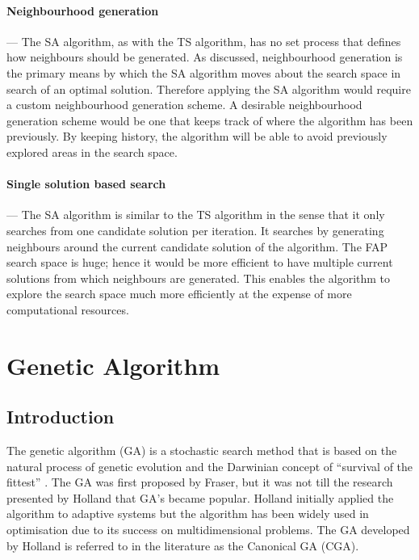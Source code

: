 \paragraph{Neighbourhood generation}
--- The \gls{SA} algorithm, as with the \gls{TS} algorithm, has no set process that defines how neighbours should be generated. As discussed, neighbourhood generation is the primary means by which the \gls{SA} algorithm moves about the search space in search of an optimal solution. Therefore applying the \gls{SA} algorithm would require a custom neighbourhood generation scheme. A desirable neighbourhood generation scheme would be one that keeps track of where the algorithm has been previously. By keeping history, the algorithm will be able to avoid previously explored areas in the search space.
\paragraph{Single solution based search}
--- The \gls{SA} algorithm is similar to the \gls{TS} algorithm in the sense that it only searches from one candidate solution per iteration. It searches by generating neighbours around the current candidate solution of the algorithm. The \gls{FAP} search space is huge; hence it would be more efficient to have multiple current solutions from which neighbours are generated. This enables the algorithm to explore the search space much more efficiently at the expense of more computational resources.

\section{Genetic Algorithm}
\label{sec:geneticalgorithm}
\subsection{Introduction}
The genetic algorithm (GA) is a stochastic search method that is based on the natural process of genetic evolution and the Darwinian concept of ``survival of the fittest'' \cite{DistributedHierarchicalGA,AcceleratingGA,AdaptiveSAGA,FamilyGA}. The \gls{GA} was first proposed by Fraser, but it was not till the research presented by Holland that \gls{GA}'s became popular\cite{CompuIntelligenceIntro}. Holland initially applied the algorithm to adaptive systems but the algorithm has been widely used in optimisation due to its success on multidimensional problems\cite{ParallelGASA,DistributedHierarchicalGA,FamilyGA}. The \gls{GA} developed by Holland is referred to in the literature as the Canonical \gls{GA} (CGA)\cite{CompuIntelligenceIntro}.


